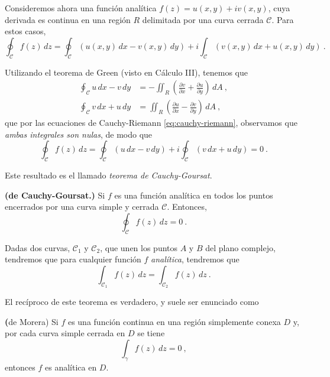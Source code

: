 Consideremos ahora una función analítica $f(z) = u(x,y) + iv(x,y)$, cuya derivada es continua en una región $R$ delimitada por una curva cerrada $\mathcal{C}$. Para estos casos, 
\begin{equation*}
    \oint_{\mathcal{C}} f(z) \, dz = \oint_{\mathcal{C}}(u(x,y) \, dx - v(x,y) \, dy) + i \int_{\mathcal{C}}(v(x,y) \, dx + u(x,y) \, dy) \ .
\end{equation*}

Utilizando el teorema de Green (visto en Cálculo III), tenemos que 
\begin{align}
    \oint_{\mathcal{C}} u \, dx - v \, dy & = - \iint_R \left( \frac{\partial v}{\partial x} + \frac{\partial u}{\partial y} \right) \, dA \ , \\
    \oint_{\mathcal{C}} v \, dx + u \, dy & = \iint_R \left( \frac{\partial u}{\partial x} - \frac{\partial v}{\partial y} \right) \, dA \ ,
\end{align}
que por las ecuaciones de Cauchy-Riemann \eqref{eq:cauchy-riemann}, observamos que \emph{ambas integrales son nulas}, de modo que 
\begin{equation}
    \oint_\mathcal{C} f(z) \, dz = \oint_{\mathcal{C}} (u \, dx - v \, dy) + i \oint_{\mathcal{C}} (v \, dx + u \, dy) = 0 \ .
\end{equation}

Este resultado es el llamado \emph{teorema de Cauchy-Goursat}.

\begin{teorema}{\textbf{(de Cauchy-Goursat.)}} 
    Si $f$ es una función analítica en todos los puntos encerrados por una curva simple y cerrada $\mathcal{C}$. Entonces,
    \begin{equation}
        \oint_\mathcal{C} f(z) \, dz = 0 \ .
    \end{equation}
\end{teorema}

\begin{corolario}
    Dadas dos curvas, $\mathcal{C}_1$ y $\mathcal{C}_2$, que unen los puntos $A$ y $B$ del plano complejo, tendremos que para cualquier función $f$ \emph{analítica}, tendremos que 
    \begin{equation}
        \int_{\mathcal{C}_1} f(z) \, dz = \int_{\mathcal{C}_2} f(z) \, dz \ .
    \end{equation}
\end{corolario}

El recíproco de este teorema es verdadero, y suele ser enunciado como 
\begin{teorema}{\textbf(de Morera)}
    Si $f$ es una función continua en una región simplemente conexa $D$ y, por cada curva simple cerrada en $D$ se tiene 
    \begin{equation*}
        \int_\gamma f(z) \, dz = 0 \ ,
    \end{equation*}
    entonces $f$ es analítica en $D$.
\end{teorema}

